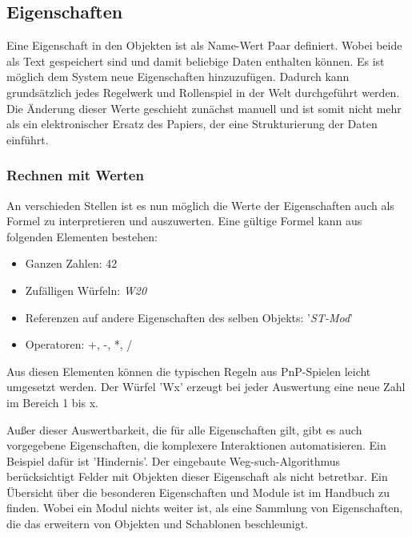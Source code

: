\subsection{Eigenschaften}
\label{sec:Eigenschaften}
Eine Eigenschaft in den Objekten ist als Name-Wert Paar definiert. Wobei beide als Text gespeichert sind und damit beliebige Daten enthalten können. Es ist möglich dem System neue Eigenschaften hinzuzufügen. Dadurch kann grundsätzlich jedes Regelwerk und Rollenspiel in der Welt durchgeführt werden. Die Änderung dieser Werte geschieht zunächst manuell und ist somit nicht mehr als ein elektronischer Ersatz des Papiers, der eine Strukturierung der Daten einführt.\newline

\subsubsection{Rechnen mit Werten}
An verschieden Stellen ist es nun möglich die Werte der Eigenschaften auch als Formel zu interpretieren und auszuwerten. Eine gültige Formel kann aus folgenden Elementen bestehen:
\begin{itemize}
	\item Ganzen Zahlen: 42
	\item Zufälligen Würfeln: \textit{W20}
	\item Referenzen auf andere Eigenschaften des selben Objekts: '\textit{ST-Mod}'
	\item Operatoren: +, -, *, /
\end{itemize}

Aus diesen Elementen können die typischen Regeln aus PnP-Spielen leicht umgesetzt werden. Der Würfel 'Wx' erzeugt bei jeder Auswertung eine neue Zahl im Bereich 1 bis x.

Außer dieser Auswertbarkeit, die für alle Eigenschaften gilt, gibt es auch vorgegebene Eigenschaften, die komplexere Interaktionen automatisieren.\newline
Ein Beispiel dafür ist 'Hindernis'. Der eingebaute Weg-such-Algorithmus berücksichtigt Felder mit Objekten dieser Eigenschaft als nicht betretbar. Ein Übersicht über die besonderen Eigenschaften und Module ist im Handbuch zu finden. Wobei ein Modul nichts weiter ist, als eine Sammlung von Eigenschaften, die das erweitern von Objekten und Schablonen beschleunigt.

